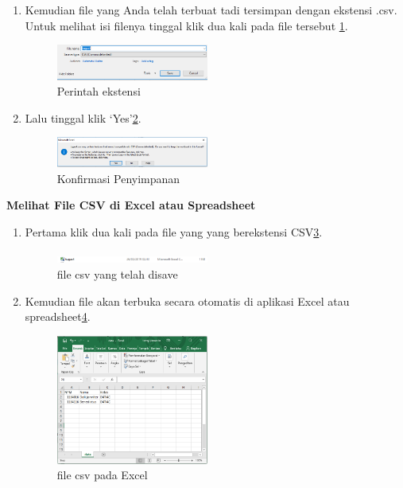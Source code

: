 \begin{enumerate}
\begin{enumerate}
\item Kemudian file yang Anda telah terbuat tadi tersimpan dengan ekstensi .csv. Untuk melihat isi filenya tinggal klik dua kali pada file tersebut \ref{ekstensi}.

		\begin{figure}[H]	\includegraphics[width=5cm]{figures/4/1154121/3.png}
			\centering
        \caption{Perintah ekstensi}
        \label{ekstensi}
		\end{figure}
		
	   \item Lalu tinggal klik `Yes'\ref{lokasipenyimpanan}.
	
		\begin{figure}[H] \includegraphics[width=5cm]{figures/4/1154121/4.png}
		\centering
		\caption{Konfirmasi Penyimpanan}
        \label{lokasipenyimpanan}
        \end{figure}
        \end{enumerate}

   \textbf{Melihat File CSV di Excel atau Spreadsheet}

	 \begin{enumerate}
		\item Pertama klik dua kali pada file yang yang berekstensi CSV\ref{filecsv}.
		
		\begin{figure}[H]	\includegraphics[width=5cm]{figures/4/1154121/5.png}
		\centering
		\caption{file csv yang telah disave}
        \label{filecsv}
        \end{figure}
		
		\item Kemudian file akan terbuka secara otomatis di aplikasi Excel atau spreadsheet\ref{filecsv1}.
		
		\begin{figure}[H] \includegraphics[width=5cm]{figures/4/1154121/6.png}
		\centering
        \caption{file csv pada Excel}
        \label{filecsv1}
		\end{figure}
	 \end{enumerate}


\end{enumerate}
